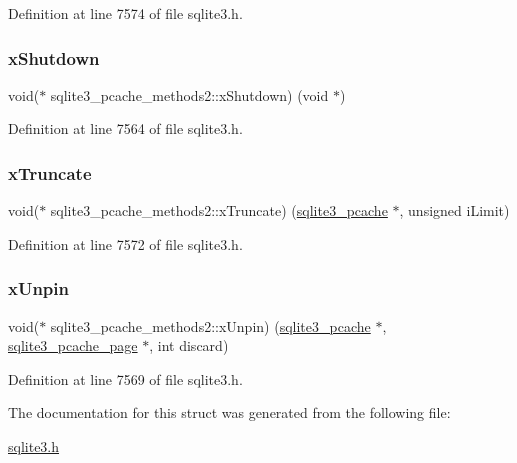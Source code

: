 Definition at line 7574 of file sqlite3.\+h.

\mbox{\label{structsqlite3__pcache__methods2_a4285fc03adf01cbd3283644a1072ffef}} 
\subsubsection{\texorpdfstring{x\+Shutdown}{xShutdown}}
{\footnotesize\ttfamily void($\ast$ sqlite3\+\_\+pcache\+\_\+methods2\+::x\+Shutdown) (void $\ast$)}



Definition at line 7564 of file sqlite3.\+h.

\mbox{\label{structsqlite3__pcache__methods2_a711d60b1895622a10186a2894cef1383}} 
\subsubsection{\texorpdfstring{x\+Truncate}{xTruncate}}
{\footnotesize\ttfamily void($\ast$ sqlite3\+\_\+pcache\+\_\+methods2\+::x\+Truncate) (\mbox{\hyperlink{sqlite3_8h_a096c453d937d51f7926d7d31c8e0bd2f}{sqlite3\+\_\+pcache}} $\ast$, unsigned i\+Limit)}



Definition at line 7572 of file sqlite3.\+h.

\mbox{\label{structsqlite3__pcache__methods2_a8fcb4ba48106aac8dfff247baea06e1a}} 
\subsubsection{\texorpdfstring{x\+Unpin}{xUnpin}}
{\footnotesize\ttfamily void($\ast$ sqlite3\+\_\+pcache\+\_\+methods2\+::x\+Unpin) (\mbox{\hyperlink{sqlite3_8h_a096c453d937d51f7926d7d31c8e0bd2f}{sqlite3\+\_\+pcache}} $\ast$, \mbox{\hyperlink{structsqlite3__pcache__page}{sqlite3\+\_\+pcache\+\_\+page}} $\ast$, int discard)}



Definition at line 7569 of file sqlite3.\+h.



The documentation for this struct was generated from the following file\+:\begin{DoxyCompactItemize}
\item 
\mbox{\hyperlink{sqlite3_8h}{sqlite3.\+h}}\end{DoxyCompactItemize}

